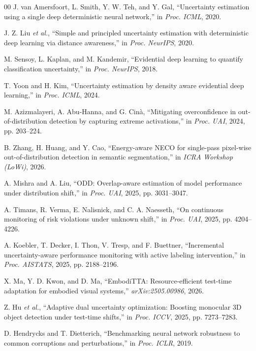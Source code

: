 \documentclass[conference]{IEEEtran}
\begin{document}
\begin{thebibliography}{00}
 J. van Amersfoort, L. Smith, Y. W. Teh, and Y. Gal, ``Uncertainty estimation using a single deep deterministic neural network,'' in \textit{Proc. ICML}, 2020.

 J. Z. Liu \textit{et al.}, ``Simple and principled uncertainty estimation with deterministic deep learning via distance awareness,'' in \textit{Proc. NeurIPS}, 2020.

 M. Sensoy, L. Kaplan, and M. Kandemir, ``Evidential deep learning to quantify classification uncertainty,'' in \textit{Proc. NeurIPS}, 2018.

 T. Yoon and H. Kim, ``Uncertainty estimation by density aware evidential deep learning,'' in \textit{Proc. ICML}, 2024.

 M. Azizmalayeri, A. Abu-Hanna, and G. Cin\`{a}, ``Mitigating overconfidence in out-of-distribution detection by capturing extreme activations,'' in \textit{Proc. UAI}, 2024, pp. 203--224.

 B. Zhang, H. Huang, and Y. Cao, ``Energy-aware NECO for single-pass pixel-wise out-of-distribution detection in semantic segmentation,'' in \textit{ICRA Workshop (LoWi)}, 2026.

 A. Mishra and A. Liu, ``ODD: Overlap-aware estimation of model performance under distribution shift,'' in \textit{Proc. UAI}, 2025, pp. 3031--3047.

 A. Timans, R. Verma, E. Nalisnick, and C. A. Naesseth, ``On continuous monitoring of risk violations under unknown shift,'' in \textit{Proc. UAI}, 2025, pp. 4204--4226.

 A. Koebler, T. Decker, I. Thon, V. Tresp, and F. Buettner, ``Incremental uncertainty-aware performance monitoring with active labeling intervention,'' in \textit{Proc. AISTATS}, 2025, pp. 2188--2196.

 X. Ma, Y. D. Kwon, and D. Ma, ``EmbodiTTA: Resource-efficient test-time adaptation for embodied visual systems,'' \textit{arXiv:2505.00986}, 2026.

 Z. Hu \textit{et al.}, ``Adaptive dual uncertainty optimization: Boosting monocular 3D object detection under test-time shifts,'' in \textit{Proc. ICCV}, 2025, pp. 7273--7283.

 D. Hendrycks and T. Dietterich, ``Benchmarking neural network robustness to common corruptions and perturbations,'' in \textit{Proc. ICLR}, 2019.


\end{thebibliography}
\end{document}
